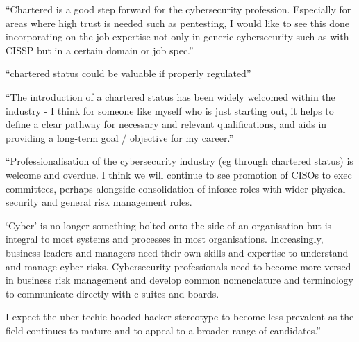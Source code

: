 \documentclass[
  a4paper,
]{book}
\begin{document}
\begin{tcolorbox}[enhanced jigsaw, leftrule=.75mm, colframe=quarto-callout-note-color-frame, opacityback=0, breakable, left=2mm, rightrule=.15mm, bottomrule=.15mm, colback=white, arc=.35mm, toprule=.15mm]

``Chartered is a good step forward for the cybersecurity profession.
Especially for areas where high trust is needed such as pentesting, I
would like to see this done incorporating on the job expertise not only
in generic cybersecurity such as with CISSP but in a certain domain or
job spec.''

\end{tcolorbox}

\begin{tcolorbox}[enhanced jigsaw, leftrule=.75mm, colframe=quarto-callout-note-color-frame, opacityback=0, breakable, left=2mm, rightrule=.15mm, bottomrule=.15mm, colback=white, arc=.35mm, toprule=.15mm]

``chartered status could be valuable if properly regulated''

\end{tcolorbox}

\begin{tcolorbox}[enhanced jigsaw, leftrule=.75mm, colframe=quarto-callout-note-color-frame, opacityback=0, breakable, left=2mm, rightrule=.15mm, bottomrule=.15mm, colback=white, arc=.35mm, toprule=.15mm]

``The introduction of a chartered status has been widely welcomed within
the industry - I think for someone like myself who is just starting out,
it helps to define a clear pathway for necessary and relevant
qualifications, and aids in providing a long-term goal / objective for
my career.''

\end{tcolorbox}

\begin{tcolorbox}[enhanced jigsaw, leftrule=.75mm, colframe=quarto-callout-note-color-frame, opacityback=0, breakable, left=2mm, rightrule=.15mm, bottomrule=.15mm, colback=white, arc=.35mm, toprule=.15mm]

``Professionalisation of the cybersecurity industry (eg through
chartered status) is welcome and overdue. I think we will continue to
see promotion of CISOs to exec committees, perhaps alongside
consolidation of infosec roles with wider physical security and general
risk management roles.

`Cyber' is no longer something bolted onto the side of an organisation
but is integral to most systems and processes in most organisations.
Increasingly, business leaders and managers need their own skills and
expertise to understand and manage cyber risks. Cybersecurity
professionals need to become more versed in business risk management and
develop common nomenclature and terminology to communicate directly with
c-suites and boards.

I expect the uber-techie hooded hacker stereotype to become less
prevalent as the field continues to mature and to appeal to a broader
range of candidates.''

\end{tcolorbox}
\end{document}
